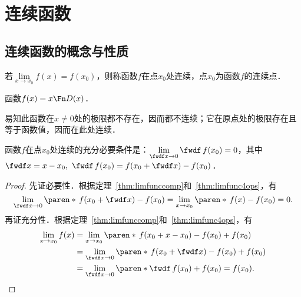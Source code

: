 \chapter{连续函数}
\label{ch:cont}

\section{连续函数的概念与性质}

\begin{definition}[连续]
  \label{defn:cont}
  若\(\lim\limits_{x\to x_0} f(x) = f(x_0)\)，则称函数\(f\)在点\(x_0\)处连续，点\(x_0\)为函数\(f\)的连续点．
\end{definition}

\begin{example*}
  函数\(f(x) = x \Fn D(x)\)．

  \begin{remark}
    易知此函数在\(x \ne 0\)处的极限都不存在，因而都不连续；它在原点处的极限存在且等于函数值，因而在此处连续．
  \end{remark}
\end{example*}

\begin{theorem}
  \label{thm:contequivdefn}
  函数\(f\)在点\(x_0\)处连续的充分必要条件是：\(\lim\limits_{\fwdf x \to 0} \fwdf\,f(x_0) = 0\)，其中\(\fwdf x = x - x_0,\ \fwdf\,f(x_0) = f(x_0+\fwdf x) - f(x_0)\)．

  \begin{proof}
    先证必要性．根据定理~\ref{thm:limfunccomp}和~\ref{thm:limfunc4ops}，有
    \begin{equation*}
      \lim_{\fwdf x \to 0} \paren*{\,f(x_0 + \fwdf x) - f(x_0)}
      = \lim_{x\to x_0} \paren*{\,f(x) - f(x_0)}
      = 0.
    \end{equation*}
    再证充分性．根据定理~\ref{thm:limfunccomp}和~\ref{thm:limfunc4ops}，有
    \begin{equation*}
      \begin{split}
        \lim_{x\to x_0} f(x)
        &= \lim_{x\to x_0} \paren*{\,f(x_0 + x - x_0) - f(x_0) + f(x_0)} \\
        &= \lim_{\fwdf x \to 0} \paren*{\,f(x_0 + \fwdf x) - f(x_0) + f(x_0)} \\
        &= \lim_{\fwdf x \to 0} \paren*{\fwdf\,f(x_0) + f(x_0)} = f(x_0).
        \qedhere
      \end{split}
    \end{equation*}
  \end{proof}
\end{theorem}

